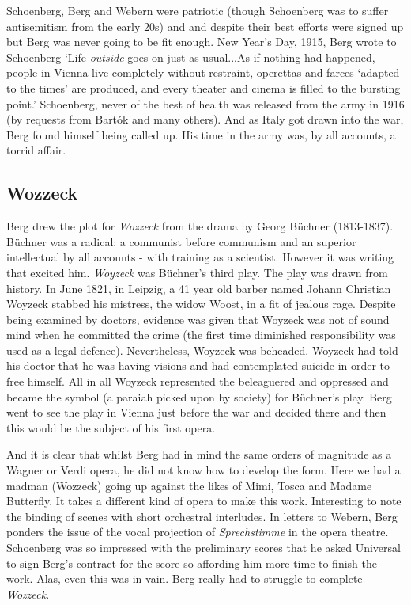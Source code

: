 Schoenberg, Berg and Webern were patriotic (though Schoenberg was to suffer antisemitism from the early 20s) and and despite their best efforts were signed up but Berg was never going to be fit enough. New Year's Day, 1915, Berg wrote to Schoenberg `Life \textit{outside} goes on just as usual...As if nothing had happened, people in Vienna live completely without restraint, operettas and farces `adapted to the times' are produced, and every theater and cinema is filled to the bursting point.' Schoenberg, never of the best of health was released from the army in 1916 (by requests from Bart\'ok and many others). And as Italy got drawn into the war, Berg found himself being called up. His time in the army was, by all accounts, a torrid affair.  

\subsection{Wozzeck}
Berg drew the plot for \textit{Wozzeck} from the drama by Georg B\"uchner (1813-1837). B\"uchner was a radical: a communist before communism and an superior intellectual by all accounts - with training as a scientist. However it was writing that excited him. \textit{Woyzeck} was B\"uchner's third play. The play was drawn from history. In June 1821, in Leipzig, a 41 year old barber named Johann Christian Woyzeck stabbed his mistress, the widow Woost, in a fit of jealous rage. Despite being examined by doctors, evidence was given that Woyzeck was not of sound mind when he committed the crime (the first time diminished responsibility was used as a legal defence). Nevertheless, Woyzeck was beheaded. Woyzeck had told his doctor that he was having visions and had contemplated suicide in order to free himself. All in all Woyzeck represented the beleaguered and oppressed and became the symbol (a paraiah picked upon by society) for B\"uchner's play. Berg went to see the play in Vienna just before the war and decided there and then this would be the subject of his first opera.

And it is clear that whilst Berg had in mind the same orders of magnitude as a Wagner or Verdi opera, he did not know how to develop the form. Here we had a madman (Wozzeck) going up against the likes of Mimi, Tosca and Madame Butterfly. It takes a different kind of opera to make this work. Interesting to note the binding of scenes with short orchestral interludes. In letters to Webern, Berg ponders the issue of the vocal projection of \textit{Sprechstimme} in the opera theatre. Schoenberg was so impressed with the preliminary scores that he asked Universal to sign Berg's contract for the score so affording him more time to finish the work. Alas, even this was in vain. Berg really had to struggle to complete \textit{Wozzeck}. 

